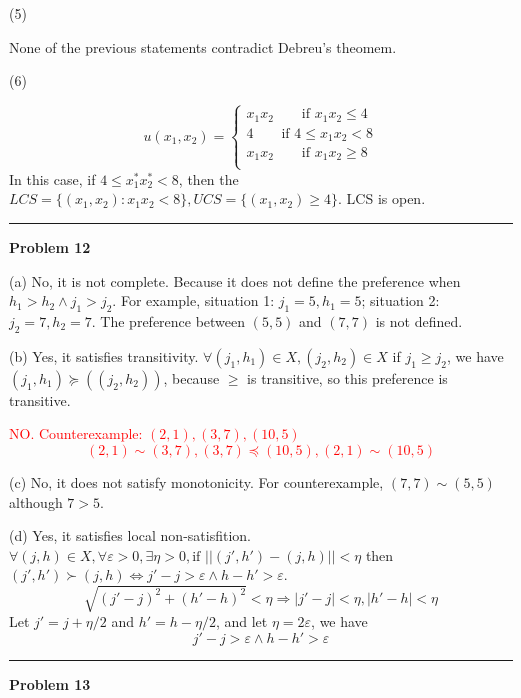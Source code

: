 \documentclass[letterpaper, 11pt]{article}
\newcommand{\1}{\mathds{1}}	%
\theoremstyle{definition}
\begin{document}
(5)

None of the previous statements contradict Debreu's theomem.

(6)

\[
    u(x_1,x_2) = \left\{\begin{array}{l}
        x_1x_2 \qquad \text{if } x_1x_2 \leq 4  \\
        4  \qquad \text{if } 4 \leq x_1x_2 < 8  \\
        x_1x_2 \qquad \text{if } x_1x_2  \geq 8 \\
    \end{array}\right.
\]
In this case, if $4 \leq x_1^*x_2^* < 8$, then the $LCS = \{(x_1, x_2): x_1x_2 < 8\}, UCS = \{(x_1,x_2) \geq 4\}$. LCS is open.

\bigskip
\hrule
\bigskip

\textbf{Problem 12}

(a) No, it is not complete. Because it does not define the preference when $h_1 > h_2 \wedge j_1 > j_2$. For example, situation 1: $j_1 = 5, h_1 = 5$; situation 2: $j_2 = 7, h_2 = 7$. The preference between $(5,5)$ and $(7,7)$ is not defined.

(b) Yes, it satisfies transitivity. $\forall (j_1,h_1) \in X, (j_2,h_2) \in X$ if $j_1 \geq j_2$, we have $(j_1,h_1) \succeq ((j_2,h_2))$, because $\geq $ is transitive, so this preference is transitive.

\textcolor{red}{NO. Counterexample: $(2,1), (3,7), (10,5)$\[
    (2,1) \sim (3,7), (3,7) \preceq (10,5), (2,1) \sim (10,5)
\]}

(c) No, it does not satisfy monotonicity. For counterexample, $(7,7) \sim (5,5)$ although $7>5$.

(d) Yes, it satisfies local non-satisfition. $\forall (j, h) \in X, \forall \varepsilon > 0, \exists \eta > 0,  \text{if } ||(j',h') - (j,h)|| < \eta$ then $(j',h') \succ (j,h) \iff j' - j > \varepsilon  \wedge h - h' > \varepsilon$. \[
    \sqrt{(j'-j)^{2} + (h'-h)^{2}} < \eta \Longrightarrow \left| j' -j \right| < \eta , \left| h'-h \right| < \eta
\]
Let $j' = j + \eta/2$ and $h'= h - \eta / 2 $, and let $\eta = 2\varepsilon$, we have \[
    j' - j > \varepsilon  \wedge h - h' > \varepsilon
\]

\bigskip
\hrule
\bigskip

\textbf{Problem 13}
\end{document}

